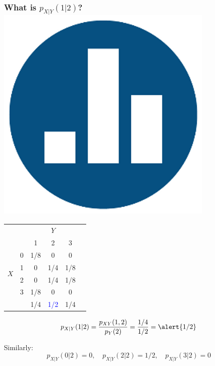 \documentclass[handout]{beamer}
\begin{document}
\begin{frame}
\frametitle{What is $p_{X|Y}(1|2)$? \hfill \includegraphics[scale = 0.05]{./images/clicker}}
\small
\begin{table}
\begin{tabular}{|cc|ccc|c|}
\hline
&&\multicolumn{3}{c|}{$Y$}&\\
&&1 & 2&3&\\
\hline
\multirow{4}{*}{$X$}
&0& \multicolumn{1}{|c}{1/8} & \alert{0}&0&\\
&1& \multicolumn{1}{|c}{0} & \alert{1/4}&1/8&\\
&2& \multicolumn{1}{|c}{0} & \alert{1/4}&1/8&\\
&3& \multicolumn{1}{|c}{1/8} & \alert{0}&0&\\
\hline 
&&1/4&\textcolor{blue}{1/2}&1/4&\\
\hline
\end{tabular}
\end{table}

\pause
\begin{equation}
	p_{X|Y}(1|2) =\frac{p_{XY}(1,2)}{p_Y(2)}=\frac{1/4}{1/2}= \alert{1/2}
\end{equation}

  \pause

Similarly: 
$$p_{X|Y}(0|2)=0, \quad p_{X|Y}(2|2)=1/2, \quad p_{X|Y}(3|2)= 0$$


\end{frame}

\end{document}
